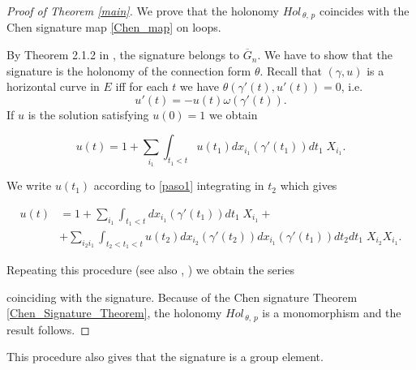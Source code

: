 \documentclass{amsart}
\begin{document}

\begin{proof}[Proof of Theorem \ref{main}]
We prove that the holonomy $Hol_{\,\theta,\,p}$ coincides with the Chen signature map \eqref{Chen_map} on loops. 



By Theorem 2.1.2 in \cite{Lyons1}, the signature belongs to $\overline{G}_n$.  We have to show that the signature is the holonomy of the connection form $\theta$. Recall that 
$(\gamma, u)$ is a horizontal curve in $E$ iff for each $t$ we have $\theta(\gamma '(t), u'(t))=0$, i.e.
\begin{equation}\label{linear}
u'(t)= -u(t)\omega (\gamma'(t)).
\end{equation}
If $u$ is the solution satisfying $u(0)=1$ we obtain 

\begin{equation}\label{paso1}
 u(t)=1+\sum_{i_1}\int_{t_1<t}u(t_1)dx_{i_1}(\gamma'(t_1)) dt_1 \; X_{i_1} . 
\end{equation}

We write $u(t_1)$ according to \eqref{paso1}  integrating in $t_2$ which gives 

\begin{equation}
\begin{split}
 u(t)&=1+\sum_{i_1}\int_{t_1<t}dx_{i_1}(\gamma'(t_1)) dt_1 \; X_{i_1} + \\
  &+\sum_{i_2 i_1}\int_{t_2<t_1<t}u(t_2)dx_{i_2}(\gamma'(t_2))dx_{i_1}(\gamma'(t_1)) dt_2 dt_1 \; X_{i_2}X_{i_1}. 
\end{split}
\end{equation}



Repeating this procedure (see also \cite{Loll},  \cite{Neretin}) we obtain the series  

  coinciding with the signature. Because of the Chen signature Theorem \ref{Chen_Signature_Theorem}, the holonomy $Hol_{\,\theta,\,p}$ is a monomorphism and the result follows.
\end{proof}

This procedure also gives that the signature is a group element.  

\medskip
\end{document}
